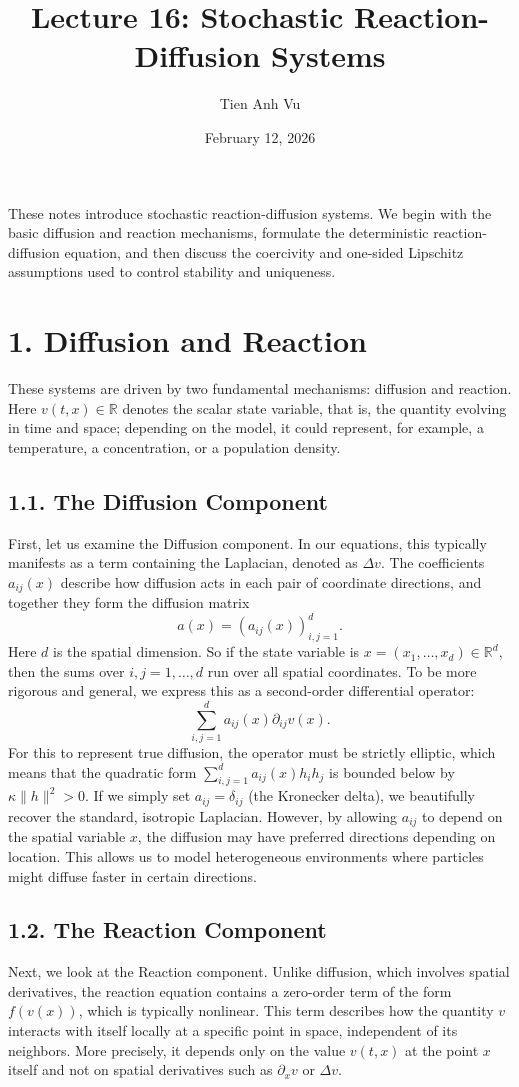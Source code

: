 \documentclass[11pt]{article}
\title{Lecture 16: Stochastic Reaction-Diffusion Systems}
\date{February 12, 2026}
\author{Tien Anh Vu}
\theoremstyle{definition}
\theoremstyle{remark}
\begin{document}
\maketitle

These notes introduce stochastic reaction-diffusion systems. We begin with the basic diffusion and reaction mechanisms, formulate the deterministic reaction-diffusion equation, and then discuss the coercivity and one-sided Lipschitz assumptions used to control stability and uniqueness.

\section*{1. Diffusion and Reaction}
These systems are driven by two fundamental mechanisms: diffusion and reaction.
Here $v(t,x)\in\mathbb R$ denotes the scalar state variable, that is, the quantity evolving in time and space; depending on the model, it could represent, for example, a temperature, a concentration, or a population density.

\subsection*{1.1. The Diffusion Component}
First, let us examine the Diffusion component. In our equations, this typically manifests as a term containing the Laplacian, denoted as $\Delta v$. The coefficients $a_{ij}(x)$ describe how diffusion acts in each pair of coordinate directions, and together they form the diffusion matrix
\[
a(x)=(a_{ij}(x))_{i,j=1}^d.
\]
Here $d$ is the spatial dimension. So if the state variable is $x=(x_1,\dots,x_d)\in\mathbb R^d$, then the sums over $i,j=1,\dots,d$ run over all spatial coordinates. To be more rigorous and general, we express this as a second-order differential operator:
\[
\sum_{i,j=1}^d a_{ij}(x)\partial_{ij}v(x).
\]
For this to represent true diffusion, the operator must be strictly elliptic, which means that the quadratic form $\sum_{i,j=1}^d a_{ij}(x)h_i h_j$ is bounded below by $\kappa\|h\|^2>0$. If we simply set $a_{ij}=\delta_{ij}$ (the Kronecker delta), we beautifully recover the standard, isotropic Laplacian. However, by allowing $a_{ij}$ to depend on the spatial variable $x$, the diffusion may have preferred directions depending on location. This allows us to model heterogeneous environments where particles might diffuse faster in certain directions.

\subsection*{1.2. The Reaction Component}
Next, we look at the Reaction component. Unlike diffusion, which involves spatial derivatives, the reaction equation contains a zero-order term of the form $f(v(x))$, which is typically nonlinear. This term describes how the quantity $v$ interacts with itself locally at a specific point in space, independent of its neighbors.
More precisely, it depends only on the value $v(t,x)$ at the point $x$ itself and not on spatial derivatives such as $\partial_x v$ or $\Delta v$.
\end{document}
